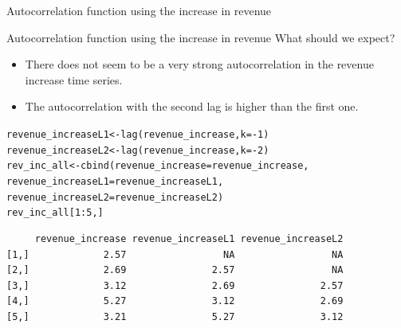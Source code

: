 \documentclass{beamer}\usepackage[]{graphicx}\usepackage[]{color}
\makeatletter
\newcommand{\hlnum}[1]{\textcolor[rgb]{0.824,0.412,0.118}{#1}}%
\newcommand{\hlopt}[1]{\textcolor[rgb]{1,0.894,0.769}{#1}}%
\newcommand{\hlstd}[1]{\textcolor[rgb]{1,0.894,0.769}{#1}}%
\newcommand{\hlkwb}[1]{\textcolor[rgb]{0.804,0.776,0.451}{#1}}%
\newcommand{\hlkwc}[1]{\textcolor[rgb]{0.78,0.941,0.545}{#1}}%
\newcommand{\hlkwd}[1]{\textcolor[rgb]{1,0.78,0.769}{#1}}%
\newenvironment{kframe}{%
 \def\at@end@of@kframe{}%
 \ifinner\ifhmode%
  \def\at@end@of@kframe{\end{minipage}}%
  \begin{minipage}{\columnwidth}%
 \fi\fi%
 \def\FrameCommand##1{\hskip\@totalleftmargin \hskip-\fboxsep
 \colorbox{shadecolor}{##1}\hskip-\fboxsep
     \hskip-\linewidth \hskip-\@totalleftmargin \hskip\columnwidth}%
 \MakeFramed {\advance\hsize-\width
   \@totalleftmargin\z@ \linewidth\hsize
   \@setminipage}}%
 {\par\unskip\endMakeFramed%
 \at@end@of@kframe}
\newenvironment{knitrout}{}{} %
\makeatother
\begin{document}
\begin{darkframes}
\begin{frame}[fragile]{Autocorrelation function using the increase in revenue}
\begin{knitrout}
\end{knitrout}
    \end{frame}
    
    
    \begin{frame}[fragile]{Autocorrelation function using the increase in revenue}       \fontsize{9}{9}\selectfont
      What should we expect?
      \begin{itemize}
        \item There does not seem to be a very strong autocorrelation in the revenue increase time series.
        \item The autocorrelation with the second lag is higher than the first one.
      \end{itemize}
      
    \end{frame}
    
    
    \begin{frame}[fragile]
     \fontsize{8}{8}\selectfont
\begin{knitrout}
\begin{kframe}
\begin{alltt}
\hlstd{revenue_increaseL1} \hlkwb{<-} \hlkwd{lag}\hlstd{(revenue_increase,} \hlkwc{k}\hlstd{=}\hlopt{-}\hlnum{1}\hlstd{)}
\hlstd{revenue_increaseL2} \hlkwb{<-} \hlkwd{lag}\hlstd{(revenue_increase,} \hlkwc{k}\hlstd{=}\hlopt{-}\hlnum{2}\hlstd{)}
\hlstd{rev_inc_all} \hlkwb{<-} \hlkwd{cbind}\hlstd{(}\hlkwc{revenue_increase} \hlstd{= revenue_increase,}
                     \hlkwc{revenue_increaseL1} \hlstd{= revenue_increaseL1,}
                     \hlkwc{revenue_increaseL2} \hlstd{= revenue_increaseL2)}
\hlstd{rev_inc_all[}\hlnum{1}\hlopt{:}\hlnum{5}\hlstd{,]}
\end{alltt}
\begin{verbatim}
     revenue_increase revenue_increaseL1 revenue_increaseL2
[1,]             2.57                 NA                 NA
[2,]             2.69               2.57                 NA
[3,]             3.12               2.69               2.57
[4,]             5.27               3.12               2.69
[5,]             3.21               5.27               3.12
\end{verbatim}
\end{kframe}
\end{knitrout}
    
     \end{frame}
     

\end{darkframes}
\end{document}
